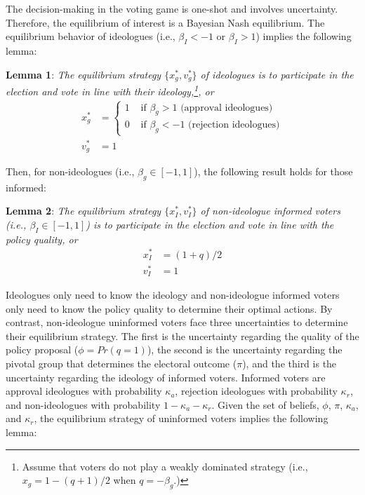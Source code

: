 \documentclass[letterpaper, 12pt]{article}
\begin{document}
    
    \par The decision-making in the voting game is one-shot and involves uncertainty. Therefore, the equilibrium of interest is a Bayesian Nash equilibrium. The equilibrium behavior of ideologues (i.e., $\beta_I < -1$ or $\beta_I > 1$) implies the following lemma:
    
    \noindent \textbf{Lemma 1}: \textit{The equilibrium strategy $\{x^*_g, v^*_g\}$ of ideologues is to participate in the election and vote in line with their ideology,\footnote{Assume that voters do not play a weakly dominated strategy (i.e., $x_g=1-(q+1)/2$ when $q = - \beta_g$.)}, or} 
    \begin{align}
    x^*_g &= \begin{cases}
    1 &\text{ if } \beta_g > 1 \text{ (approval ideologues)}\\
    0 &\text{ if } \beta_g < -1 \text{ (rejection ideologues)}
    \end{cases} \\
    v^*_g &= 1
    \end{align}
    
    \noindent Then, for non-ideologues (i.e., $\beta_g \in [-1, 1]$), the following result holds for those informed: 
    
    \noindent \textbf{Lemma 2}: \textit{The equilibrium strategy $\{x^*_I, v^*_I\}$ of non-ideologue informed voters (i.e., $\beta_I \in [-1, 1]$) is to participate in the election and vote in line with the policy quality, or} 
    \begin{align}
    x^*_I &= (1 + q)/2 \\ 
    v^*_I &= 1
    \end{align}
    
    \par Ideologues only need to know the ideology and non-ideologue informed voters only need to know the policy quality to determine their optimal actions. By contrast, non-ideologue uninformed voters face three uncertainties to determine their equilibrium strategy. The first is the uncertainty regarding the quality of the policy proposal ($\phi = Pr(q=1)$), the second is the uncertainty regarding the pivotal group that determines the electoral outcome ($\pi$), and the third is the uncertainty regarding the ideology of informed voters. Informed voters are approval ideologues with probability $\kappa_{a}$, rejection ideologues with probability $\kappa_{r}$, and non-ideologues with probability $1 - \kappa_{a} - \kappa_{r}$. Given the set of beliefs, $\phi$, $\pi$, $\kappa_{a}$, and $\kappa_{r}$, the equilibrium strategy of uninformed voters implies the following lemma:
    
\end{document}
